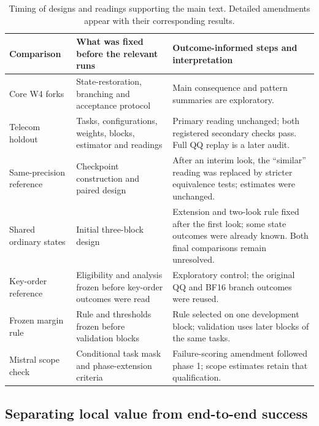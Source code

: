 \begin{table}[t]
\centering\small
\setlength{\tabcolsep}{5pt}\renewcommand{\arraystretch}{1.12} %
\begin{tabular}{@{}P{2.7cm}P{5.6cm}P{6.6cm}@{}} %
\toprule
Comparison & What was fixed before the relevant runs & Outcome-informed steps and interpretation \\
\midrule
Core W4 forks & State-restoration, branching and acceptance protocol & Main consequence and pattern summaries are exploratory. \\
Telecom holdout & Tasks, configurations, weights, blocks, estimator and readings & Primary reading unchanged; both registered secondary checks pass. Full QQ replay is a later audit. \\
Same-precision reference & Checkpoint construction and paired design & After an interim look, the ``similar'' reading was replaced by stricter equivalence tests; estimates were unchanged. \\
Shared ordinary states & Initial three-block design & Extension and two-look rule fixed after the first look; some state outcomes were already known. Both final comparisons remain unresolved. \\
Key-order reference & Eligibility and analysis frozen before key-order outcomes were read & Exploratory control; the original QQ and BF16 branch outcomes were reused. \\
Frozen margin rule & Rule and thresholds frozen before validation blocks & Rule selected on one development block; validation uses later blocks of the same tasks. \\
Mistral scope check & Conditional task mask and phase-extension criteria & Failure-scoring amendment followed phase 1; scope estimates retain that qualification. \\
\bottomrule
\end{tabular}
\caption{Timing of designs and readings supporting the main text. Detailed amendments appear with their corresponding results.}
\label{tab:timeline}
\end{table}

\subsection{Separating local value from end-to-end success}
\label{app:e2e}

